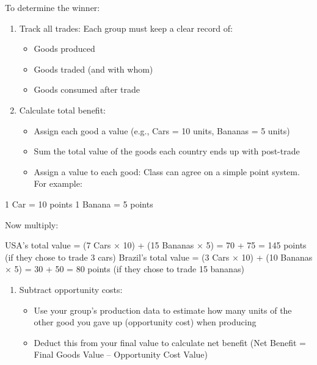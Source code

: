 \documentclass[
  11pt,
]{article}
\providecommand{\tightlist}{%
  \setlength{\itemsep}{0pt}\setlength{\parskip}{0pt}}
\begin{document}
To determine the winner:

\begin{enumerate}
\def\labelenumi{\arabic{enumi}.}
\tightlist
\item
  Track all trades: Each group must keep a clear record of:

  \begin{itemize}
  \tightlist
  \item
    Goods produced
  \item
    Goods traded (and with whom)
  \item
    Goods consumed after trade
  \end{itemize}
\item
  Calculate total benefit:

  \begin{itemize}
  \tightlist
  \item
    Assign each good a value (e.g., Cars = 10 units, Bananas = 5 units)
  \item
    Sum the total value of the goods each country ends up with
    post-trade
  \item
    Assign a value to each good: Class can agree on a simple point
    system. For example:
  \end{itemize}
\end{enumerate}

1 Car = 10 points 1 Banana = 5 points

Now multiply:

USA's total value = (7 Cars × 10) + (15 Bananas × 5) = 70 + 75 = 145
points (if they chose to trade 3 cars) Brazil's total value = (3 Cars ×
10) + (10 Bananas × 5) = 30 + 50 = 80 points (if they chose to trade 15
bananas)

\begin{enumerate}
\def\labelenumi{\arabic{enumi}.}
\setcounter{enumi}{2}
\tightlist
\item
  Subtract opportunity costs:

  \begin{itemize}
  \tightlist
  \item
    Use your group's production data to estimate how many units of the
    other good you gave up (opportunity cost) when producing
  \item
    Deduct this from your final value to calculate net benefit (Net
    Benefit = Final Goods Value -- Opportunity Cost Value)
  \end{itemize}
\end{enumerate}
\end{document}
